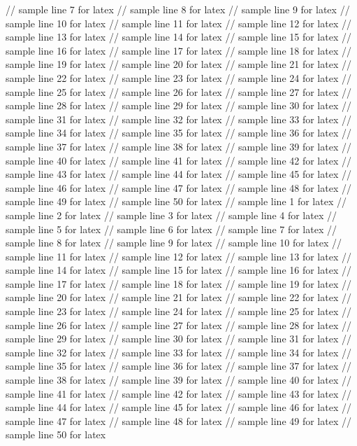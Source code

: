 // sample line 7 for latex
// sample line 8 for latex
// sample line 9 for latex
// sample line 10 for latex
// sample line 11 for latex
// sample line 12 for latex
// sample line 13 for latex
// sample line 14 for latex
// sample line 15 for latex
// sample line 16 for latex
// sample line 17 for latex
// sample line 18 for latex
// sample line 19 for latex
// sample line 20 for latex
// sample line 21 for latex
// sample line 22 for latex
// sample line 23 for latex
// sample line 24 for latex
// sample line 25 for latex
// sample line 26 for latex
// sample line 27 for latex
// sample line 28 for latex
// sample line 29 for latex
// sample line 30 for latex
// sample line 31 for latex
// sample line 32 for latex
// sample line 33 for latex
// sample line 34 for latex
// sample line 35 for latex
// sample line 36 for latex
// sample line 37 for latex
// sample line 38 for latex
// sample line 39 for latex
// sample line 40 for latex
// sample line 41 for latex
// sample line 42 for latex
// sample line 43 for latex
// sample line 44 for latex
// sample line 45 for latex
// sample line 46 for latex
// sample line 47 for latex
// sample line 48 for latex
// sample line 49 for latex
// sample line 50 for latex
// sample line 1 for latex
// sample line 2 for latex
// sample line 3 for latex
// sample line 4 for latex
// sample line 5 for latex
// sample line 6 for latex
// sample line 7 for latex
// sample line 8 for latex
// sample line 9 for latex
// sample line 10 for latex
// sample line 11 for latex
// sample line 12 for latex
// sample line 13 for latex
// sample line 14 for latex
// sample line 15 for latex
// sample line 16 for latex
// sample line 17 for latex
// sample line 18 for latex
// sample line 19 for latex
// sample line 20 for latex
// sample line 21 for latex
// sample line 22 for latex
// sample line 23 for latex
// sample line 24 for latex
// sample line 25 for latex
// sample line 26 for latex
// sample line 27 for latex
// sample line 28 for latex
// sample line 29 for latex
// sample line 30 for latex
// sample line 31 for latex
// sample line 32 for latex
// sample line 33 for latex
// sample line 34 for latex
// sample line 35 for latex
// sample line 36 for latex
// sample line 37 for latex
// sample line 38 for latex
// sample line 39 for latex
// sample line 40 for latex
// sample line 41 for latex
// sample line 42 for latex
// sample line 43 for latex
// sample line 44 for latex
// sample line 45 for latex
// sample line 46 for latex
// sample line 47 for latex
// sample line 48 for latex
// sample line 49 for latex
// sample line 50 for latex
